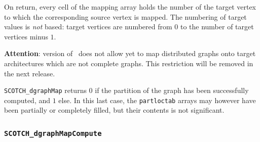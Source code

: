 \begin{itemize}
On return, every cell of the mapping array holds the number of the
target vertex to which the corresponding source vertex is mapped.
The numbering of target values is {\em not\/} based: target vertices
are numbered from $0$ to the number of target vertices minus $1$.

{\bf Attention}: version {} of \scotch\ does not allow yet to
map distributed graphs onto target architectures which are not
complete graphs. This restriction will be removed in the next release.

\progret

{\tt SCOTCH\_dgraphMap} returns $0$ if the partition of the graph has
been successfully computed, and $1$ else. In this last case, the
{\tt partloctab} arrays may however have been partially or completely
filled, but their contents is not significant.
\end{itemize}

\subsubsection{{\tt SCOTCH\_dgraphMapCompute}}

